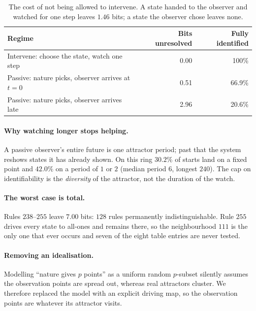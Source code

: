 \documentclass[11pt]{article}
\begin{document}
\begin{table}[h]
\centering
\begin{tabular}{lrr}
\toprule
Regime & Bits unresolved & Fully identified \\
\midrule
Intervene: choose the state, watch one step & 0.00 & 100\% \\
Passive: nature picks, observer arrives at $t=0$ & 0.51 & 66.9\% \\
Passive: nature picks, observer arrives late & 2.96 & 20.6\% \\
\bottomrule
\end{tabular}
\caption{The cost of not being allowed to intervene. A state handed to the observer and
watched for one step leaves $1.46$ bits; a state the observer chose leaves none.}
\end{table}

\paragraph{Why watching longer stops helping.}
A passive observer's entire future is one attractor period; past that the system
reshows states it has already shown. On this ring $30.2\%$ of starts land on a fixed
point and $42.0\%$ on a period of $1$ or $2$ (median period $6$, longest $240$). The
cap on identifiability is the \emph{diversity} of the attractor, not the duration of
the watch.

\paragraph{The worst case is total.}
Rules $238$--$255$ leave $7.00$ bits: $128$ rules permanently indistinguishable. Rule
$255$ drives every state to all-ones and remains there, so the neighbourhood $111$ is
the only one that ever occurs and seven of the eight table entries are never tested.

\paragraph{Removing an idealisation.}
Modelling ``nature gives $p$ points'' as a uniform random $p$-subset silently assumes
the observation points are spread out, whereas real attractors cluster. We therefore
replaced the model with an explicit driving map, so the observation points are whatever
its attractor visits.
\end{document}
